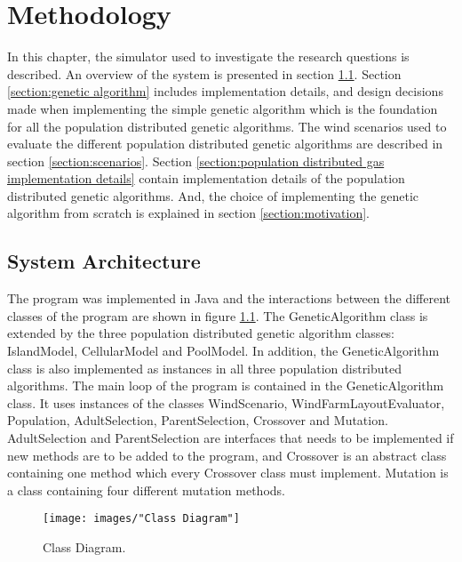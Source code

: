 \chapter{Methodology}\label{chapter:methodology}
In this chapter, the simulator used to investigate the research questions is described. An overview of the system is presented in section \ref{section:systemt architecture}. Section \ref{section:genetic algorithm} includes implementation details, and design decisions made when implementing the simple genetic algorithm which is the foundation for all the population distributed genetic algorithms. The wind scenarios used to evaluate the different population distributed genetic algorithms are described in section \ref{section:scenarios}.
Section \ref{section:population distributed gas implementation details} contain implementation details of the population distributed genetic algorithms. And, the choice of implementing the genetic algorithm from scratch is explained in section \ref{section:motivation}.


\section{System Architecture}\label{section:systemt architecture}
The program was implemented in Java and the interactions between the different classes of the program are shown in figure \ref{figure:class diagram}. The GeneticAlgorithm class is extended by the three population distributed genetic algorithm classes: IslandModel, CellularModel and PoolModel. In addition, the GeneticAlgorithm class is also implemented as instances in all three population distributed algorithms. The main loop of the program is contained in the GeneticAlgorithm class. It uses instances of the classes WindScenario, WindFarmLayoutEvaluator, Population, AdultSelection, ParentSelection, Crossover and Mutation. AdultSelection and ParentSelection are interfaces that needs to be implemented if new methods are to be added to the program, and Crossover is an abstract class containing one method which every Crossover class must implement. Mutation is a class containing four different mutation methods. 


\begin{figure}[h!]
\begin{center}
\texttt{[image: images/"Class Diagram"]}
\caption{Class Diagram.}
\label{figure:class diagram}
\end{center}
\end{figure}


